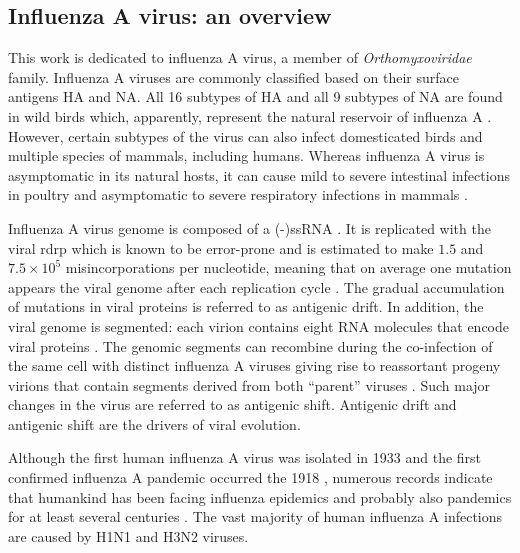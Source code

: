 	\subsection{Influenza A virus: an overview}
	
	This work is dedicated to influenza A virus, a member of  \textit{Orthomyxoviridae} family. Influenza A viruses are commonly classified based on their surface antigens \gls{HA} and \gls{NA}. All 16 subtypes of \gls{HA} and all 9 subtypes of \gls{NA} are found in wild birds which, apparently, represent the natural reservoir of influenza A \parencite{Stallknecht2007}. However, certain subtypes of the virus can also infect domesticated birds and multiple species of mammals, including humans. Whereas influenza A virus is asymptomatic in its natural hosts, it can cause mild to severe intestinal infections in poultry and asymptomatic to severe respiratory infections in mammals \parencite{Webster1992a}. 
	
	Influenza A virus genome is composed of a \gls{(-)ssRNA} \parencite{Palese1977}. It is replicated with the viral \gls{rdrp} which is known to be error-prone and is estimated to make $1.5$ and $7.5\times10^5$ misincorporations per nucleotide, meaning that on average one mutation appears the viral genome after each replication cycle \parencite{Drake1993, Parvin1986}. The gradual accumulation of mutations in viral proteins is referred to as antigenic drift.	In addition, the viral genome is segmented: each virion contains eight RNA molecules that encode viral proteins \parencite{McGeoch1976}. The genomic segments can recombine during the co-infection of the same cell with distinct influenza A viruses giving rise to reassortant progeny virions that contain segments derived from both ``parent'' viruses \parencite{Desselberger1978}. Such major changes in the virus are referred to as antigenic shift. Antigenic drift and antigenic shift are the drivers of viral evolution.
		
	
	
	Although the first human influenza A virus was isolated in 1933 \parencite{Smith1933} and the first confirmed influenza A pandemic occurred the 1918 \parencite{Taubenberger1997}, numerous records indicate that humankind has been facing influenza epidemics and probably also pandemics for at least several centuries \parencite{Potter2001}. The vast majority of human influenza A infections are caused by H1N1 and H3N2 viruses.
	
